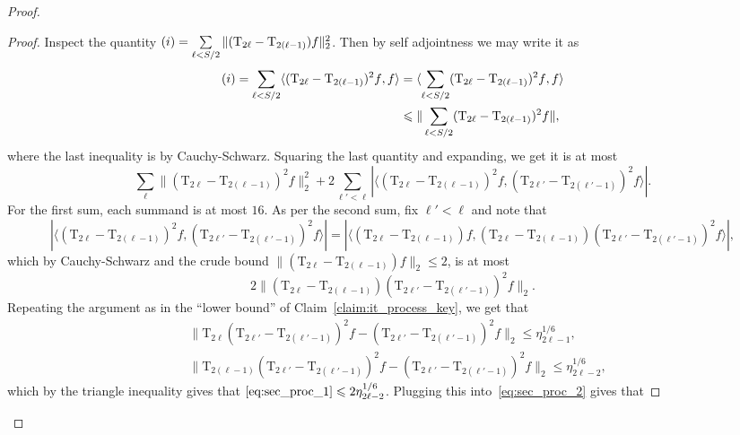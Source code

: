\documentclass[10pt,a4paper]{amsart}
\newcommand\card[1]{\left| {#1} \right|}
\newcommand\norm[1]{\| #1 \|}
\newcommand\inner[2]{\langle{#1},{#2}\rangle}
\renewcommand\leq{\leqslant}
\newcommand{\rom}[1]{\uppercase\expandafter{\romannumeral #1\relax}}
\begin{document}
\begin{proof}
\begin{proof}
        Inspect the quantity 
        $(\rom{1}) = \sum\limits_{\ell<S/2}\norm{(\mathrm{T}_{2\ell}-\mathrm{T}_{2(\ell-1)})f}_2^2$. Then by self adjointness we may write it as
        \begin{align*}
        (\rom{1})
        =
        \sum\limits_{\ell<S/2}\inner{(\mathrm{T}_{2\ell}-\mathrm{T}_{2(\ell-1)})^2f}{f}
        &=\inner{\sum\limits_{\ell<S/2}(\mathrm{T}_{2\ell}-\mathrm{T}_{2(\ell-1)})^2f}{f}\\
        &\leq \norm{\sum\limits_{\ell<S/2}(\mathrm{T}_{2\ell}-\mathrm{T}_{2(\ell-1)})^2f},
        \end{align*}
        where the last inequality is by Cauchy-Schwarz. Squaring the last quantity and expanding, we get it is at most
        \begin{equation}\label{eq:sec_proc_2}
        \sum\limits_{\ell}\norm{(\mathrm{T}_{2\ell}-\mathrm{T}_{2(\ell-1)})^2f}_2^2+2\sum\limits_{\ell'<\ell}\card{\inner{(\mathrm{T}_{2\ell}-\mathrm{T}_{2(\ell-1)})^2f}{(\mathrm{T}_{2\ell'}-\mathrm{T}_{2(\ell'-1)})^2f}}.
        \end{equation}
        For the first sum, each summand is at most $16$. As per the second sum, fix $\ell'<\ell$ and note that 
        \[
        \card{\inner{(\mathrm{T}_{2\ell}-\mathrm{T}_{2(\ell-1)})^2f}{(\mathrm{T}_{2\ell'}-\mathrm{T}_{2(\ell'-1)})^2f}}
        =\card{\inner{(\mathrm{T}_{2\ell}-\mathrm{T}_{2(\ell-1)})f}{(\mathrm{T}_{2\ell}-\mathrm{T}_{2(\ell-1)})(\mathrm{T}_{2\ell'}-\mathrm{T}_{2(\ell'-1)})^2f}},
        \]
        which by Cauchy-Schwarz and the crude bound $\norm{(\mathrm{T}_{2\ell}-\mathrm{T}_{2(\ell-1)})f}_2\leq 2$, is at most 
        \begin{equation}\label{eq:sec_proc_1}
        2\norm{(\mathrm{T}_{2\ell}-\mathrm{T}_{2(\ell-1)})(\mathrm{T}_{2\ell'}-\mathrm{T}_{2(\ell'-1)})^2f}_2.
        \end{equation}
        Repeating the argument as in the ``lower bound'' of Claim~\ref{claim:it_process_key}, we get that 
        \begin{align*}
        &\norm{\mathrm{T}_{2\ell}(\mathrm{T}_{2\ell'}-\mathrm{T}_{2(\ell'-1)})^2f-(\mathrm{T}_{2\ell'}-\mathrm{T}_{2(\ell'-1)})^2f}_2\leq \eta_{2\ell-1}^{1/6},\\
        &\norm{\mathrm{T}_{2(\ell-1)}(\mathrm{T}_{2\ell'}-\mathrm{T}_{2(\ell'-1)})^2f-(\mathrm{T}_{2\ell'}-\mathrm{T}_{2(\ell'-1)})^2f}_2\leq \eta_{2\ell-2}^{1/6},
        \end{align*}
        which by the triangle inequality gives that 
        $\eqref{eq:sec_proc_1}\leq 2\eta_{2\ell-2}^{1/6}$. Plugging this into~\eqref{eq:sec_proc_2} gives that 

\end{proof}
\end{proof}
\end{document}
